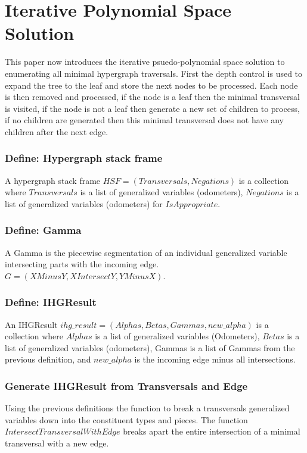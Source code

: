 \chapter{Iterative Polynomial Space Solution}

This paper now introduces the iterative psuedo-polynomial space solution to enumerating all minimal hypergraph traversals. First the depth control is used to expand the tree to the leaf and store the next nodes to be processed. Each node is then removed and processed, if the node is a leaf then the minimal transversal is visited, if the node is not a leaf then generate a new set of children to process, if no children are generated then this minimal transversal does not have any children after the next edge. 

\subsection{Define: Hypergraph stack frame}
A hypergraph stack frame $HSF = (Transversals,Negations)$ is a collection where $Transversals$ is a list of generalized variables (odometers), $Negations$ is a list of generalized variables (odometers) for $IsAppropriate$.


\subsection{Define: Gamma}
A Gamma is the piecewise segmentation of an individual generalized variable intersecting parts with the incoming edge. $G = (XMinusY, XIntersectY, YMinusX)$.

\subsection{Define: IHGResult }
An IHGResult $ihg\_result = (Alphas,Betas,Gammas,new\_alpha)$ is a collection where $Alphas$ is a list of generalized variables (Odometers), $Betas$ is a list of generalized variables (odometers), Gammas is a list of Gammas from the previous definition, and $new\_alpha$ is the incoming edge minus all intersections.

\subsection{Generate IHGResult from Transversals and Edge}
Using the previous definitions the function to break a transversals generalized variables down into the constituent types and pieces. The function $IntersectTransversalWithEdge$ breaks apart the entire intersection of a minimal transversal with a new edge. 

